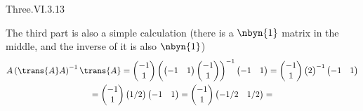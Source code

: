 \begin{ans}{Three.VI.3.13}
\begin{exparts}
           The third part is also a simple calculation
           (there is a $\nbyn{1}$ matrix in the middle,
           and the inverse of it is also $\nbyn{1}$)
           \begin{multline*}
             A\left(\trans{A}A\right)^{-1}\trans{A}
             =
             \begin{pmatrix}
               -1 \\ 1
             \end{pmatrix}
             \left(
               \begin{pmatrix}
                 -1  &1
               \end{pmatrix}
               \begin{pmatrix}
                 -1  \\
                  1
               \end{pmatrix}
             \right)^{-1}
             \begin{pmatrix}
               -1  &1
             \end{pmatrix}
             =
             \begin{pmatrix}
               -1 \\ 1
             \end{pmatrix}
               \begin{pmatrix}
                 2
               \end{pmatrix}^{-1}
             \begin{pmatrix}
               -1  &1
             \end{pmatrix}               \\
             =
             \begin{pmatrix}
               -1 \\ 1
             \end{pmatrix}
               \begin{pmatrix}
                 1/2
               \end{pmatrix}
             \begin{pmatrix}
               -1  &1
             \end{pmatrix}
             =
             \begin{pmatrix}
               -1 \\ 1
             \end{pmatrix}
             \begin{pmatrix}
               -1/2  &1/2
             \end{pmatrix}
             =

\end{multline*}
\end{exparts}
\end{ans}
